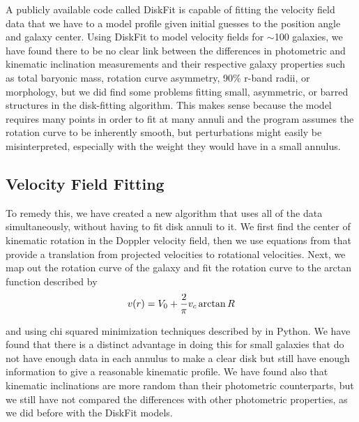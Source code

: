 \documentclass{emulateapj}
\begin{document}
\large A publicly available code called DiskFit \citep{barnes} is capable of fitting the velocity field data that we have to a model profile given initial guesses to the position angle and galaxy center. Using DiskFit to model velocity fields for $\sim$100 galaxies, we have found there to be no clear link between the differences in photometric and kinematic inclination measurements and their respective galaxy properties such as total baryonic mass, rotation curve asymmetry, 90\% r-band radii, or morphology, but we did find some problems fitting small, asymmetric, or barred structures in the disk-fitting algorithm. This makes sense because the model requires many points in order to fit at many annuli and the program assumes the rotation curve to be inherently smooth, but perturbations might easily be misinterpreted, especially with the weight they would have in a small annulus.

\subsection{Velocity Field Fitting}

\large To remedy this, we have created a new algorithm that uses all of the data simultaneously, without having to fit disk annuli to it. We first find the center of kinematic rotation in the Doppler velocity field, then we use equations from \citet{teuben} that provide a translation from projected velocities to rotational velocities. Next, we map out the rotation curve of the galaxy and fit the rotation curve to the arctan function described by \citet{courteau}
\begin{equation}
\large v(r) = V_{0}+\frac{2}{\pi}v_{c}\arctan{R}
\end{equation}

\noindent \large and using chi squared minimization techniques described by \citet{mpfit} in Python. We have found that there is a distinct advantage in doing this for small galaxies that do not have enough data in each annulus to make a clear disk but still have enough information to give a reasonable kinematic profile. We have found also that kinematic inclinations are more random than their photometric counterparts, but we still have not compared the differences with other photometric properties, as we did before with the DiskFit models.


\end{document}
